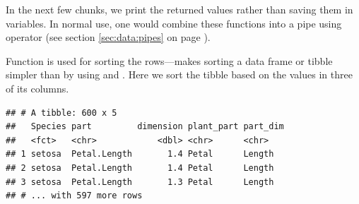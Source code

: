 \documentclass[krantz2]{krantz}\usepackage{knitr}
\begin{document}
\begin{knitrout}\footnotesize
{}\color{fgcolor}
\end{knitrout}

In the next few chunks, we print the returned values rather than saving them in variables. In normal use, one would combine these functions into a pipe using operator  (see section \ref{sec:data:pipes} on page \pageref{sec:data:pipes}).

Function  is used for sorting the rows---makes sorting a data frame or tibble simpler than by using  and . Here we sort the tibble  based on the values in three of its columns.

\begin{knitrout}\footnotesize
{}\color{fgcolor}\begin{kframe}
\begin{alltt}
\end{alltt}
\begin{verbatim}
## # A tibble: 600 x 5
##   Species part         dimension plant_part part_dim
##   <fct>   <chr>            <dbl> <chr>      <chr>
## 1 setosa  Petal.Length       1.4 Petal      Length
## 2 setosa  Petal.Length       1.4 Petal      Length
## 3 setosa  Petal.Length       1.3 Petal      Length
## # ... with 597 more rows
\end{verbatim}
\end{kframe}
\end{knitrout}
\end{document}
